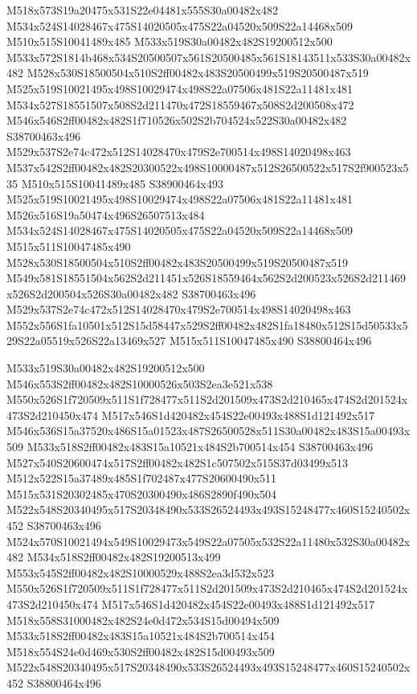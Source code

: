\documentclass{article}
\begin{document}
\begin{multicols}{2}
M518x573S19a20475x531S22e04481x555S30a00482x482 M534x524S14028467x475S14020505x475S22a04520x509S22a14468x509 M510x515S10041489x485 M533x519S30a00482x482S19200512x500 M533x572S1814b468x534S20500507x561S20500485x561S18143511x533S30a00482x482 M528x530S18500504x510S2ff00482x483S20500499x519S20500487x519 M525x519S10021495x498S10029474x498S22a07506x481S22a11481x481 M534x527S18551507x508S2d211470x472S18559467x508S2d200508x472 M546x546S2ff00482x482S1f710526x502S2b704524x522S30a00482x482 S38700463x496 M529x537S2e74c472x512S14028470x479S2e700514x498S14020498x463 M537x542S2ff00482x482S20300522x498S10000487x512S26500522x517S2f900523x535 M510x515S10041489x485 S38900464x493 M525x519S10021495x498S10029474x498S22a07506x481S22a11481x481 M526x516S19a50474x496S26507513x484 M534x524S14028467x475S14020505x475S22a04520x509S22a14468x509 M515x511S10047485x490 M528x530S18500504x510S2ff00482x483S20500499x519S20500487x519 M549x581S18551504x562S2d211451x526S18559464x562S2d200523x526S2d211469x526S2d200504x526S30a00482x482 S38700463x496 M529x537S2e74c472x512S14028470x479S2e700514x498S14020498x463 M552x556S1fa10501x512S15d58447x529S2ff00482x482S1fa18480x512S15d50533x529S22a05519x526S22a13469x527 M515x511S10047485x490 S38800464x496

M533x519S30a00482x482S19200512x500 M546x553S2ff00482x482S10000526x503S2ea3e521x538 M550x526S1f720509x511S1f728477x511S2d201509x473S2d210465x474S2d201524x473S2d210450x474 M517x546S1d420482x454S22e00493x488S1d121492x517 M546x536S15a37520x486S15a01523x487S26500528x511S30a00482x483S15a00493x509 M533x518S2ff00482x483S15a10521x484S2b700514x454 S38700463x496 M527x540S20600474x517S2ff00482x482S1c507502x515S37d03499x513 M512x522S15a37489x485S1f702487x477S20600490x511 M515x531S20302485x470S20300490x486S2890f490x504 M522x548S20340495x517S20348490x533S26524493x493S15248477x460S15240502x452 S38700463x496 M524x570S10021494x549S10029473x549S22a07505x532S22a11480x532S30a00482x482 M534x518S2ff00482x482S19200513x499 M553x545S2ff00482x482S10000529x488S2ea3d532x523 M550x526S1f720509x511S1f728477x511S2d201509x473S2d210465x474S2d201524x473S2d210450x474 M517x546S1d420482x454S22e00493x488S1d121492x517 M518x558S31000482x482S24e0d472x534S15d00494x509 M533x518S2ff00482x483S15a10521x484S2b700514x454 M518x554S24e0d469x530S2ff00482x482S15d00493x509 M522x548S20340495x517S20348490x533S26524493x493S15248477x460S15240502x452 S38800464x496


\end{multicols}
\end{document}
